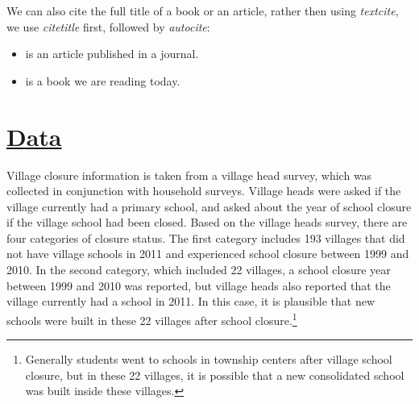 \documentclass[12pt,english]{article}
\begin{document}
We can also cite the full title of a book or an article, rather then using \emph{textcite}, we use \emph{citetitle} first, followed by \emph{autocite}: 
\begin{itemize}
    \item {} \autocite{conti_understanding_2010} is an article published in a journal.
    \item {} \autocite{becker_human_1994} is a book we are reading today.
\end{itemize}
 



\section{\href{https://papers.ssrn.com/sol3/papers.cfm?abstract_id=3140132}{Data}}

Village closure information is taken from a village head survey, which was collected in conjunction with household surveys. Village heads were asked if the village currently had a primary school, and asked about the year of school closure if the village school had been closed. Based on the village heads survey, there are four categories of closure status. The first category includes 193 villages that did not have village schools in 2011 and experienced school closure between 1999 and 2010. In the second category, which included 22 villages, a school closure year between 1999 and 2010 was reported, but village heads also reported that the village currently had a school in 2011. In this case, it is plausible that new schools were built in these 22 villages after school closure.\footnote{Generally students went to schools in township centers after village school closure, but in these 22 villages, it is possible that a new consolidated school was built inside these villages.}

\pagebreak
\begingroup
{}
\setlength\bibitemsep{6pt}
\printbibliography
\endgroup
\pagebreak
\end{document}
